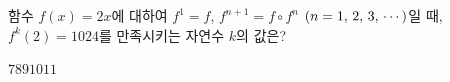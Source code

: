 \hspace*{2mm}\begin{minipage}[t]{\dimexpr\linewidth-2mm\relax}\vspace{0pt}
함수 $f(x)=2x$에 대하여 $f^1=f$, $f^{n+1}=f\circ f^n$ $(n=1,\mkern3mu 2,\mkern3mu 3,\mkern3mu \cdots)$일 때, $f^k(2)=1024$를 만족시키는 자연수 $k$의 값은?
\begin{choices32}{$7$}{$8$}{$9$}{$10$}{$11$}\end{choices32}\end{minipage}
